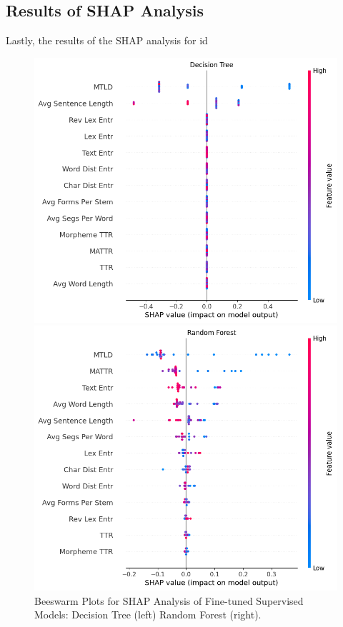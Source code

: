 \documentclass[12pt,a4paper]{article}
\numberwithin{figure}{section}
\numberwithin{table}{section}
\numberwithin{definition}{section}
\begin{document}
\subsection{Results of SHAP Analysis}
\label{ssec:featureimportancesresults}

Lastly, the results of the SHAP analysis for id

\begin{figure}[!h]
  \centering
  \begin{minipage}{0.5\textwidth}
    \includegraphics[width=\textwidth]{DT_SHAP_values.png}
  \end{minipage}\hfill
  \begin{minipage}{0.5\textwidth}
    \includegraphics[width=\textwidth]{RF_SHAP_values.png}
  \end{minipage}
    \caption{Beeswarm Plots for SHAP Analysis of Fine-tuned Supervised Models: Decision Tree (left) Random Forest (right).}
    \label{fig:supervisedshap}
\end{figure}
\end{document}
